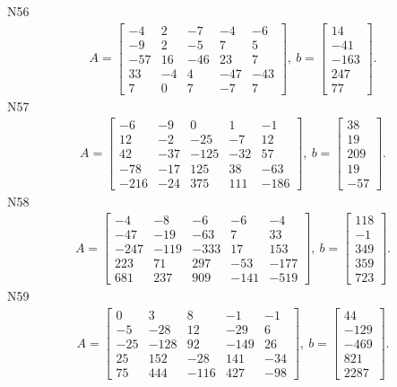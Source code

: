 \documentclass[11pt]{report}
\begin{document}
N56
\begin{align*}
 A = \left[\begin{matrix}-4 & 2 & -7 & -4 & -6\\-9 & 2 & -5 & 7 & 5\\-57 & 16 & -46 & 23 & 7\\33 & -4 & 4 & -47 & -43\\7 & 0 & 7 & -7 & 7\end{matrix}\right],
\ b = \left[\begin{matrix}14\\-41\\-163\\247\\77\end{matrix}\right]. 
 \end{align*}
N57
\begin{align*}
 A = \left[\begin{matrix}-6 & -9 & 0 & 1 & -1\\12 & -2 & -25 & -7 & 12\\42 & -37 & -125 & -32 & 57\\-78 & -17 & 125 & 38 & -63\\-216 & -24 & 375 & 111 & -186\end{matrix}\right],
\ b = \left[\begin{matrix}38\\19\\209\\19\\-57\end{matrix}\right]. 
 \end{align*}
N58
\begin{align*}
 A = \left[\begin{matrix}-4 & -8 & -6 & -6 & -4\\-47 & -19 & -63 & 7 & 33\\-247 & -119 & -333 & 17 & 153\\223 & 71 & 297 & -53 & -177\\681 & 237 & 909 & -141 & -519\end{matrix}\right],
\ b = \left[\begin{matrix}118\\-1\\349\\359\\723\end{matrix}\right]. 
 \end{align*}
N59
\begin{align*}
 A = \left[\begin{matrix}0 & 3 & 8 & -1 & -1\\-5 & -28 & 12 & -29 & 6\\-25 & -128 & 92 & -149 & 26\\25 & 152 & -28 & 141 & -34\\75 & 444 & -116 & 427 & -98\end{matrix}\right],
\ b = \left[\begin{matrix}44\\-129\\-469\\821\\2287\end{matrix}\right]. 
 \end{align*}
\end{document}
